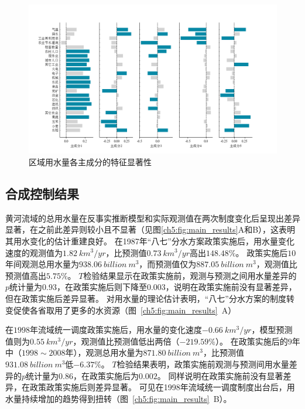\begin{figure}[!h]
    \centering
    \includegraphics[width=\textwidth]{img/ch5/ch5_variables.png}
    \caption{区域用水量各主成分的特征显著性}\label{ch5:fig:variables}
\end{figure}

\subsection{合成控制结果}\label{result-2}

黄河流域的总用水量在反事实推断模型和实际观测值在两次制度变化后呈现出差异显著，在之前此差异则较小且不显著（见图\ref{ch5:fig:main_results}A和B），这表明其用水变化的估计重建良好。
在1987年“八七”分水方案政策实施后，用水量变化速度的观测值为$1.82~km^3/yr$，比预测值$0.73~km^3/yr$高出$148.48\%$。
政策实施后$10$年间观测总用水量为$938.06~billion~m^3$，而预测值仅为$887.05~billion~m^3$，观测值比预测值高出$5.75\%$。
$T$检验结果显示在政策实施前，观测与预测之间用水量差异的$p$统计量为$0.93$，在政策实施后则下降至$0.003$，说明在政策实施前没有显著差异，但在政策实施后差异显著。
对用水量的理论估计表明，“八七”分水方案的制度转变促使各省取用了更多的水资源（图~\ref{ch5:fig:main_results}~A）

在$1998$年流域统一调度政策实施后，用水量的变化速度$-0.66~km^3/yr$，模型预测值则为$0.55~km^3/yr$，观测值比预测值低出两倍（$-219.59\%$）。
在政策实施后的$9$年中（$1998 \sim 2008$年），观测总用水量为$871.80~billion~m^3$，比预测值$931.08~billion~m^3$低$-6.37\%$。
$T$检验结果表明，政策实施前观测与预测间用水量差异的$p$统计量为$0.86$，在政策实施后为$0.002$。
同样说明在政策实施前没有显著差异，在政策政策实施后则差异显著。
可见在1998年流域统一调度制度出台后，用水量持续增加的趋势得到扭转（图~\ref{ch5:fig:main_results}~B）。

